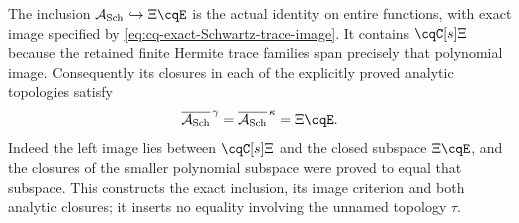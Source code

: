 The inclusion $\mathcal A_{\rm Sch}\hookrightarrow\Xi\cqE$
is the actual identity on entire functions, with exact image
specified by \eqref{eq:cq-exact-Schwartz-trace-image}. It contains
$\cqC[s]\Xi$ because the retained finite Hermite trace families
span precisely that polynomial image. Consequently its closures
in each of the explicitly proved analytic topologies satisfy
\begin{equation}\label{eq:cq-Schwartz-image-analytic-closures}
 \overline{\mathcal A_{\rm Sch}}^{\,\gamma}
 =\overline{\mathcal A_{\rm Sch}}^{\,\kappa}
 =\Xi\cqE.
\end{equation}
Indeed the left image lies between $\cqC[s]\Xi$ and the
closed subspace $\Xi\cqE$, and the closures of the smaller
polynomial subspace were proved to equal that subspace.
This constructs the exact inclusion, its image criterion and both
analytic closures; it inserts no equality involving the unnamed
topology $\tau$.
